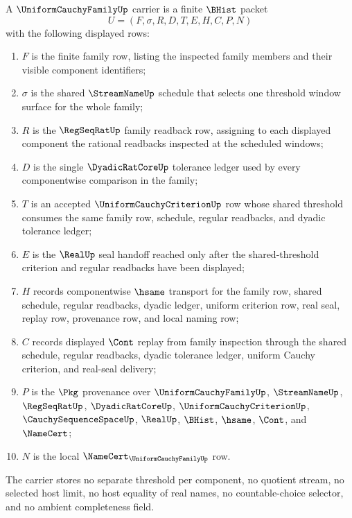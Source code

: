 \begin{definition}
\label{def:uniform-cauchy-family-carrier}
A $\UniformCauchyFamilyUp$ carrier is a finite $\BHist$ packet
$$
U=(F,\sigma,R,D,T,E,H,C,P,N)
$$
with the following displayed rows:
\begin{enumerate}
\item $F$ is the finite family row, listing the inspected family members and their visible component identifiers;
\item $\sigma$ is the shared $\StreamNameUp$ schedule that selects one threshold window surface for the whole family;
\item $R$ is the $\RegSeqRatUp$ family readback row, assigning to each displayed component the rational readbacks inspected at the scheduled windows;
\item $D$ is the single $\DyadicRatCoreUp$ tolerance ledger used by every componentwise comparison in the family;
\item $T$ is an accepted $\UniformCauchyCriterionUp$ row whose shared threshold consumes the same family row, schedule, regular readbacks, and dyadic tolerance ledger;
\item $E$ is the $\RealUp$ seal handoff reached only after the shared-threshold criterion and regular readbacks have been displayed;
\item $H$ records componentwise $\hsame$ transport for the family row, shared schedule, regular readbacks, dyadic ledger, uniform criterion row, real seal, replay row, provenance row, and local naming row;
\item $C$ records displayed $\Cont$ replay from family inspection through the shared schedule, regular readbacks, dyadic tolerance ledger, uniform Cauchy criterion, and real-seal delivery;
\item $P$ is the $\Pkg$ provenance over $\UniformCauchyFamilyUp$, $\StreamNameUp$, $\RegSeqRatUp$, $\DyadicRatCoreUp$, $\UniformCauchyCriterionUp$, $\CauchySequenceSpaceUp$, $\RealUp$, $\BHist$, $\hsame$, $\Cont$, and $\NameCert$;
\item $N$ is the local $\NameCert_{\UniformCauchyFamilyUp}$ row.
\end{enumerate}
The carrier stores no separate threshold per component, no quotient stream, no selected host limit, no host equality of real names, no countable-choice selector, and no ambient completeness field.
\end{definition}

